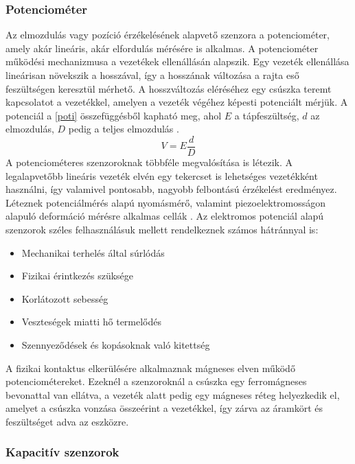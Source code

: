 \subsubsection{Potenciométer}

Az elmozdulás vagy pozíció érzékelésének alapvető szenzora a potenciométer, amely akár lineáris, akár elfordulás mérésére is alkalmas. 
A potenciométer működési mechanizmusa a vezetékek ellenállásán alapszik. Egy vezeték ellenállása lineárisan növekszik a hosszával, így a hosszának változása a rajta eső feszültségen keresztül mérhető. A hosszváltozás eléréséhez egy csúszka teremt kapcsolatot a vezetékkel, amelyen a vezeték végéhez képesti potenciált mérjük. A potenciál a \ref{poti} összefüggésből kapható meg, ahol $E$ a tápfeszültség, $d$ az elmozdulás, $D$ pedig a teljes elmozdulás \cite{Fraden2016a}.
\begin{equation}
	V = E \frac{d}{D}
	\label{poti}
\end{equation}
A potenciométeres szenzoroknak többféle megvalósítása is létezik. A legalapvetőbb lineáris vezeték elvén egy tekercset is lehetséges vezetékként használni, így valamivel pontosabb, nagyobb felbontású érzékelést eredményez. Léteznek potenciálmérés alapú nyomásmérő, valamint piezoelektromosságon alapuló deformáció mérésre alkalmas cellák \cite{Fraden2016a}.
Az elektromos potenciál alapú szenzorok széles felhasználásuk mellett rendelkeznek számos hátránnyal is:
\begin{itemize}
	\item Mechanikai terhelés által súrlódás
	\item Fizikai érintkezés szüksége
	\item Korlátozott sebesség
	\item Veszteségek miatti hő termelődés
	\item Szennyeződések és kopásoknak való kitettség
\end{itemize}
A fizikai kontaktus elkerülésére alkalmaznak mágneses elven működő potenciométereket. Ezeknél a szenzoroknál a csúszka egy ferromágneses bevonattal van ellátva, a vezeték alatt pedig egy mágneses réteg helyezkedik el, amelyet a csúszka vonzása összeérint a vezetékkel, így zárva az áramkört és feszültséget adva az eszközre.

\subsubsection{Kapacitív szenzorok}

